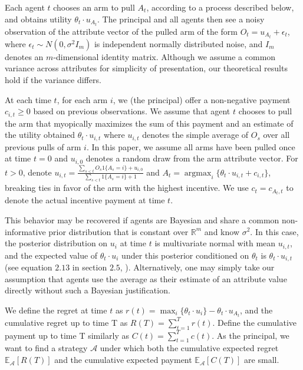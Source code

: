 \documentclass[twoside,11pt]{article}
\newcommand{\argmax}{\mathop{\mathrm{argmax}}}
\begin{document}
Each agent $t$ chooses an arm to pull $A_t$, according to a process described below, and obtains utility $\theta_t \cdot u_{A_{t}}$.  The principal and all agents then see a noisy observation of the attribute vector of the pulled arm of the form $O_t=u_{A_{t}}+\epsilon_{t}$, where $\epsilon_t\sim N(0, \sigma^2 I_{m})$ is independent normally distributed noise, and $I_m$ denotes an $m$-dimensional identity matrix.  Although we assume a common variance across attributes for simplicity of presentation, our theoretical results hold if the variance differs.

At each time $t$, for each arm $i$, we (the principal) offer a non-negative payment $c_{i,t}\geq 0$ based on previous observations.
We assume that agent $t$ chooses to pull the arm that myopically maximizes the sum of this payment and an estimate of the utility obtained $\theta_t \cdot u_{i,t}$ where $u_{i,t}$ denotes the simple average of $O_s$ over all previous pulls of arm $i$. In this paper, we assume all arms have been pulled once at time $t=0$ and $u_{i,0}$ denotes a random draw from the arm attribute vector. For $t>0$, denote $u_{i,t} = \frac{\sum_{s<t} O_s 1\{A_s = i\} + u_{i,0}}{\sum_{s<t} 1\{A_s = i\}+1}$ and $A_t=\argmax_{i}\{\theta_t\cdot u_{i,t}+c_{i,t}\}$, breaking ties in favor of the arm with the highest incentive.  We use $c_t=c_{A_{t},t}$ to denote the actual incentive payment at time $t$.

This behavior may be recovered if agents are Bayesian and share a common non-informative prior distribution that is constant over $\mathbb{R}^m$ and know $\sigma^2$.  In this case, the posterior distribution on $u_{i}$ at time $t$ is multivariate normal with mean $u_{i,t}$, and the expected value of $\theta_t \cdot u_i$ under this posterior conditioned on $\theta_t$ is $\theta_t \cdot u_{i,t}$ (see equation $2.13$ in section $2.5$, \cite{Ge04}).  Alternatively, one may simply take our assumption that agents use the average as their estimate of an attribute value directly without such a Bayesian justification.

We define the regret at time $t$ as $r(t)=\max_{i}\{\theta_{t}\cdot u_{i}\}-\theta_t\cdot u_{A_t}$, and the cumulative regret up to time T as $R(T)=\sum_{t=1}^{T}r(t)$. Define the cumulative payment up to time T similarly as $C(t)=\sum_{t=1}^{T}c(t)$. 
As the principal, we want to find a strategy $\mathcal{A}$ under which both the cumulative expected regret $\mathbb{E}_{\mathcal{A}}[R(T)]$ and the cumulative expected payment $\mathbb{E}_{\mathcal{A}}[C(T)]$ are small.
\end{document}
